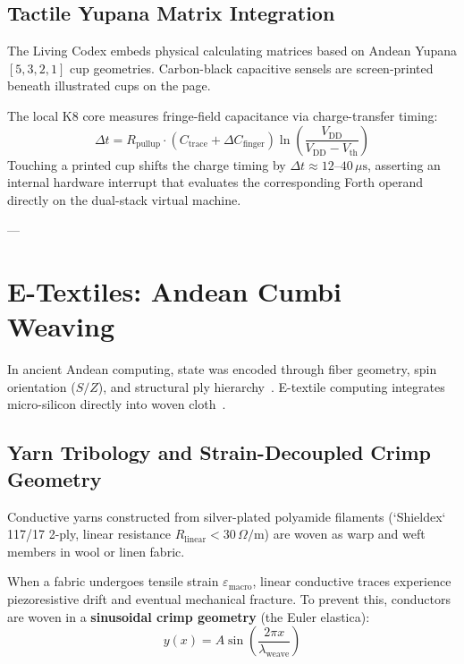\documentclass[10pt,twocolumn,letterpaper]{article}
\begin{document}
\subsection{Tactile Yupana Matrix Integration}

The Living Codex embeds physical calculating matrices based on Andean Yupana $[5, 3, 2, 1]$ cup geometries. Carbon-black capacitive sensels are screen-printed beneath illustrated cups on the page.

The local K8 core measures fringe-field capacitance via charge-transfer timing:
\begin{equation}
\Delta t = R_{\text{pullup}} \cdot (C_{\text{trace}} + \Delta C_{\text{finger}}) \ln\left(\frac{V_{\text{DD}}}{V_{\text{DD}} - V_{\text{th}}}\right)
\end{equation}
Touching a printed cup shifts the charge timing by $\Delta t \approx 12\text{--}40\,\mu\text{s}$, asserting an internal hardware interrupt that evaluates the corresponding Forth operand directly on the dual-stack virtual machine.

---

\section{E-Textiles: Andean Cumbi Weaving}

In ancient Andean computing, state was encoded through fiber geometry, spin orientation ($S/Z$), and structural ply hierarchy~\cite{hayden2026cordlink}. E-textile computing integrates micro-silicon directly into woven cloth~\cite{stoppa2014wearable}.

\subsection{Yarn Tribology and Strain-Decoupled Crimp Geometry}

Conductive yarns constructed from silver-plated polyamide filaments (`Shieldex` 117/17 2-ply, linear resistance $R_{\text{linear}} < 30\,\Omega/\text{m}$) are woven as warp and weft members in wool or linen fabric. 

When a fabric undergoes tensile strain $\varepsilon_{\text{macro}}$, linear conductive traces experience piezoresistive drift and eventual mechanical fracture. To prevent this, conductors are woven in a \textbf{sinusoidal crimp geometry} (the Euler elastica):
\begin{equation}
y(x) = A \sin\left(\frac{2\pi x}{\lambda_{\text{weave}}}\right)
\end{equation}
\end{document}

